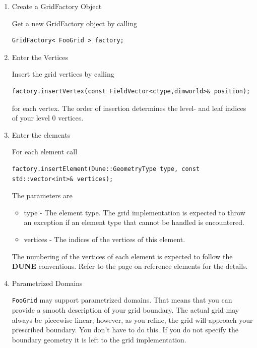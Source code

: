 \documentclass[11pt,a4paper,headinclude,footinclude,DIV16,normalheadings]{scrreprt}
\newcommand{\Dune}{{\sf\bfseries DUNE}\xspace}
\begin{document}
\begin{enumerate}
\item Create a GridFactory Object

Get a new GridFactory object by calling

\begin{lstlisting}[basicstyle=\small]
    GridFactory< FooGrid > factory;
\end{lstlisting}

\item Enter the Vertices

Insert the grid vertices by calling

\begin{lstlisting}[basicstyle=\small]
    factory.insertVertex(const FieldVector<ctype,dimworld>& position);
\end{lstlisting}

for each vertex. The order of insertion determines the level- and leaf indices of your level 0 vertices.

\item Enter the elements

For each element call

\begin{lstlisting}[basicstyle=\small]
    factory.insertElement(Dune::GeometryType type, const std::vector<int>& vertices);
\end{lstlisting}

The parameters are

\begin{itemize}
    \item type - The element type. The grid implementation is expected to throw
	an exception if an element type that cannot be handled is encountered.
    \item vertices - The indices of the vertices of this element.
\end{itemize}

The numbering of the vertices of each element is expected to follow the \Dune
conventions. Refer to the page on reference elements for the details.

\item Parametrized Domains

\lstinline!FooGrid! may support parametrized domains. That means that you can provide a smooth description of your grid boundary. The actual grid may always be piecewise linear; however, as you refine, the grid will approach your prescribed boundary. You don't have to do this. If you do not specify the boundary geometry it is left to the grid implementation.


\end{enumerate}
\end{document}
